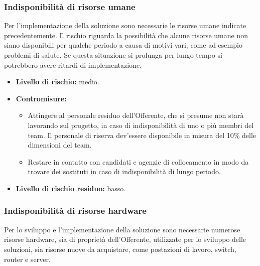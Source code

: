 				\subsubsection{Indisponibilità di risorse umane}
                	Per l'implementazione della soluzione sono necessarie le risorse umane indicate precedentemente. Il rischio riguarda la possibilità che alcune risorse umane non siano disponibili per qualche periodo a causa di motivi vari, come ad esempio problemi di salute. Se questa situazione si prolunga per lungo tempo si potrebbero avere ritardi di implementazione.
                    \begin{itemize}
                    	\item \textbf{Livello di rischio:} medio.
                        \item \textbf{Contromisure:} 
                        \begin{itemize}
                        	\item Attingere al personale residuo dell'Offerente, che si presume non starà lavorando sul progetto, in caso di indisponibilità di uno o più membri del team. Il personale di riserva dev'essere disponibile in misura del 10\% delle dimensioni del team.
                            \item Restare in contatto con candidati e agenzie di collocamento in modo da trovare dei sostituti in caso di indisponibilità di lungo periodo. 
                        \end{itemize}
                        \item \textbf{Livello di rischio residuo:} basso.
                    \end{itemize}
                    
				\subsubsection{Indisponibilità di risorse hardware}
                	Per lo sviluppo e l'implementazione della soluzione sono necessarie numerose risorse hardware, sia di proprietà dell'Offerente, utilizzate per lo sviluppo delle soluzioni, sia risorse nuove da acquistare, come postazioni di lavoro, switch, router e server. 
                    
